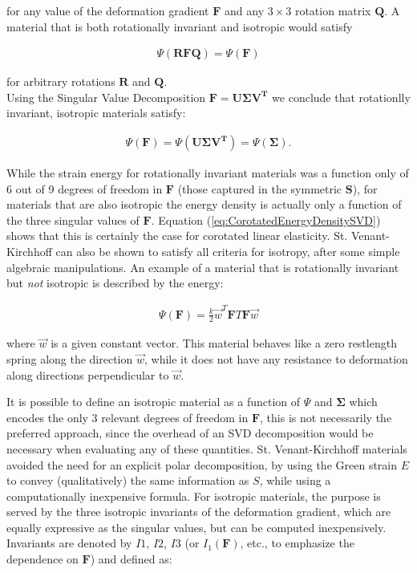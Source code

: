 for any value of the deformation gradient $\boldsymbol{F}$ and any $3 \times 3$ rotation matrix $\boldsymbol{Q}$. A material that is both 
rotationally invariant and isotropic would satisfy

\begin{gather*}
 \Psi(\boldsymbol{RFQ})=\Psi(\boldsymbol{F})
\end{gather*}

for arbitrary rotations $\boldsymbol{R}$ and $\boldsymbol{Q}$.\\

Using the Singular Value Decomposition $\boldsymbol{F} = \boldsymbol{U\Sigma V^T}$ we conclude that rotationlly invariant, isotropic materials satisfy:

\begin{gather*}
 \Psi(\boldsymbol{F})=\Psi(\boldsymbol{U\Sigma V^T}) = \Psi(\boldsymbol{\Sigma}).
\end{gather*}

While the strain energy for rotationally invariant materials was a function only of 6 out of 9 degrees of freedom in $\boldsymbol{F}$ (those 
captured in the symmetric $\boldsymbol{S}$), for materials that are also isotropic the energy density is actually only a function of the three 
singular values of $\boldsymbol{F}$. Equation (\ref{eq:CorotatedEnergyDensitySVD}) shows that this is certainly the case for corotated linear 
elasticity. St. Venant-Kirchhoff can also be shown to satisfy all criteria for isotropy, after some simple algebraic manipulations. An example 
of a material that is rotationally invariant but \textit{not} isotropic is described by the energy:

\begin{gather*}
 \Psi(\boldsymbol{F}) = \frac{k}{2}\vec{w}^T\boldsymbol{F}T\boldsymbol{F}\vec{w}
\end{gather*}

where $\vec{w}$ is a given constant vector. This material behaves like a zero restlength spring along the direction $\vec{w}$, while it does
not have any resistance to deformation along directions perpendicular to $\vec{w}$.

It is possible to define an isotropic material as a function of $\Psi$ and $\boldsymbol{\Sigma}$ which encodes the only 3 relevant degrees of freedom
in $\boldsymbol{F}$, this is not necessarily the preferred approach, since the overhead of an SVD decomposition would be necessary when evaluating 
any of these quantities. St. Venant-Kirchhoff materials avoided the need for an explicit polar decomposition, by using the Green strain $E$
to convey (qualitatively) the same information as $S$, while using a computationally inexpensive formula. For isotropic materials, the purpose is served 
by the three isotropic invariants of the deformation gradient, which are equally expressive as the singular values, but can be computed inexpensively. 
Invariants are denoted by $I1$, $I2$, $I3$ (or $I_1(\boldsymbol{F})$, etc., to emphasize the dependence on $\boldsymbol{F}$) and defined as:

